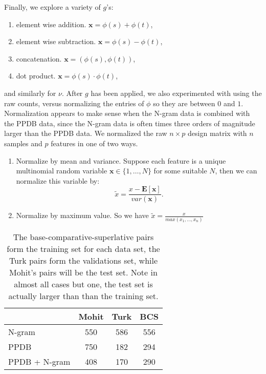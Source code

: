 Finally, we explore a variety of $g$'s:

\begin{enumerate}
	\item element wise addition. $\pmb{x} = \phi(s) + \phi(t)$,
	\item element wise subtraction. $\pmb{x} = \phi(s) - \phi(t)$,
	\item concatenation. $\pmb{x} = (\phi(s), \phi(t))$,
	\item dot product. $\pmb{x} = \phi(s) \cdot \phi(t)$,
\end{enumerate}

and similarly for $\nu$. After $g$ has been applied, we also experimented with using the raw counts, versus normalizing the entries of $\phi$ so they are between $0$ and $1$. Normalization appears to make sense when the N-gram data is combined with the PPDB data, since the N-gram data is often times three orders of magnitude larger than the PPDB data. We normalized the raw $n \times p$ design matrix with $n$ samples and $p$ features in one of two ways.

\begin{enumerate}
	\item Normalize by mean and variance. Suppose each feature is a unique multinomial random variable $\pmb{x} \in \{1,\ldots,N\}$ for some suitable $N$, then we can normalize this variable by:
		\[	
			\tilde{x} = \frac{x - \pmb{E}[\pmb{x}]}{var(\pmb{x})}.
		\]
	\item Normalize by maximum value. So we have $\tilde{x} = \frac{x}{max(x_1,\ldots,x_n)}$
\end{enumerate}


\begin{table}
\small
\centering
\begin{tabular}{|l|c|c|c|}
	\hline 
	& \multicolumn{1}{c|}{Mohit} 
	& \multicolumn{1}{c|}{Turk} 
	& \multicolumn{1}{c|}{BCS} \\
	\hline 
	N-gram          & 550 & 586 & 556 \\
	PPDB            & 750 & 182 & 294 \\
	PPDB + N-gram   & 408 & 170 & 290 \\
	\hline
\end{tabular}
\caption{\label{font-table} The base-comparative-superlative pairs form the training set for each data set, the Turk pairs form the validations set, while Mohit's pairs will be the test set. Note in almost all cases but one, the test set is actually larger than than the training set. }
\end{table}


